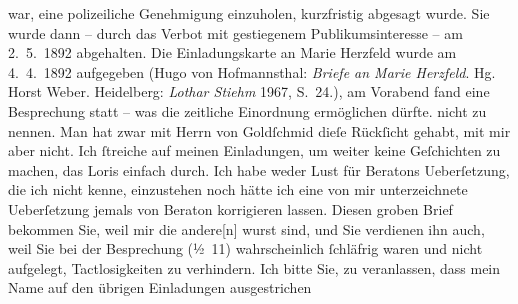 \begin{ledgroupsized}[t]{13cm}
{{{                        war, eine polizeiliche Genehmigung einzuholen, kurzfristig abgesagt wurde.
                        Sie wurde dann – durch das Verbot mit gestiegenem Publikumsinteresse – am
                            2. 5. 1892 abgehalten. Die Einladungskarte an Marie Herzfeld wurde am
                            4. 4. 1892 aufgegeben (Hugo von Hofmannsthal: \emph{Briefe an Marie Herzfeld}. Hg. Horst Weber.
                            Heidelberg: \emph{Lothar Stiehm}{ }1967, S. 24.), am Vorabend fand eine Besprechung
                        statt – was die zeitliche Einordnung ermöglichen dürfte.}}}\label{K_L00092_1h} nicht zu
                    nennen. Man hat zwar mit Herrn von
                        Goldſchmid dieſe Rückſicht gehabt, mit mir aber nicht. Ich ſtreiche
                    auf meinen Einladungen, um weiter keine Geſchichten zu machen, das Loris einfach
                    durch. Ich habe {\pb}weder Lust für Beratons Ueberſetzung, die ich nicht
                    kenne, einzustehen noch hätte ich eine von mir unterzeichnete Ueberſetzung jemals
                    von Beraton korrigieren lassen. Diesen
                    groben Brief bekommen Sie, weil mir die andere{[}n{]} wurst sind, und Sie verdienen
                    ihn auch, weil Sie bei der Besprechung (½ 11) wahrscheinlich
                    ſchläfrig waren und nicht aufgelegt, Tactlosigkeiten zu verhindern.\pend
           \pstart
           Ich bitte
                    Sie, zu veranlassen, dass mein Name auf den übrigen Einladungen ausgestrichen

\end{ledgroupsized}
